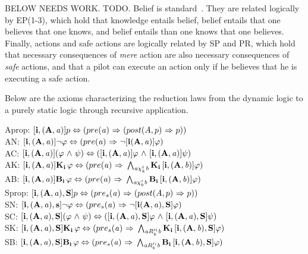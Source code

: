 BELOW NEEDS WORK.
TODO. Belief is standard~\cite{FHMV}. They are related logically by EP(1-3), which hold that knowledge entails belief, belief entails that one believes that one knows, and belief entails than one knows that one believes. Finally, actions and safe actions are logically related by SP and PR, which hold that necessary consequences of \emph{mere} action are also necessary consequences of \emph{safe} actions, and that a pilot can execute an action only if he believes that he is executing a safe action. 

Below are the axioms characterizing the reduction laws from the dynamic logic to a purely static logic through recursive application.\\
\begin{tcolorbox}
	Aprop: $\mathbf{[i,(A,\mathit{a})]}p \Leftrightarrow (pre(\mathit{a}){\ \Rightarrow \ }(post(A,p) {\ \Rightarrow \ } p))$\\
	AN: $\mathbf{[i,(A,\mathit{a})]}{\neg}\varphi \Leftrightarrow (pre(\mathit{a}) {\ \Rightarrow \ } {\neg} \mathbf{[i(A,\mathit{a})]}\varphi)$\\
	AC: $\mathbf{[i,(A,\mathit{a})]}(\varphi {\ \wedge \ } \psi) \Leftrightarrow (\mathbf{[i,(A,\mathit{a})]}\varphi {\ \wedge \ } \mathbf{[i,(A,\mathit{a})]}\psi)$\\
	AK: $\mathbf{[i,(A,\mathit{a})]}\mathbf{K}_{\mathbf{i}}\,\varphi \Leftrightarrow (pre(\mathit{a}) {\ \Rightarrow \ } \bigwedge_{\mathit{a}\chi_{k}^i \mathit{b}}\mathbf{K}_{\mathbf{i}}\,\mathbf{[i,(A,\mathit{b})]}\varphi)$\\
	AB: $\mathbf{[i,(A,\mathit{a})]}\mathbf{B}_{\mathbf{i}}\,\varphi \Leftrightarrow (pre(\mathit{a}) {\ \Rightarrow \ } \bigwedge_{\mathit{a}\chi_{b}^i \mathit{b}}\mathbf{B}_{\mathbf{i}}\,\mathbf{[i,(A,\mathit{b})]}\varphi)$\\
	Sprop: $\mathbf{[i,(A,\mathit{a}),S]}p \Leftrightarrow (pre_s(\mathit{a}) {\ \Rightarrow \ } (post(A,p) {\ \Rightarrow \ } p))$\\
	SN: $\mathbf{[i,(A,\mathit{a}),s]}{\neg}\varphi \Leftrightarrow (pre_s(\mathit{a}) {\ \Rightarrow \ } {\neg} \mathbf{[i(A,\mathit{a}),S]}\varphi)$\\
	SC: $\mathbf{[i,(A,\mathit{a}),S]}(\varphi {\ \wedge \ } \psi) \Leftrightarrow (\mathbf{[i,(A,\mathit{a}),S]}\varphi {\ \wedge \ } \mathbf{[i,(A,\mathit{a}),S]}\psi)$\\
	SK: $\mathbf{[i,(A,\mathit{a}),S]}\mathbf{K}_{\mathbf{i}}\,\varphi \Leftrightarrow (pre_s(\mathit{a}) {\ \Rightarrow \ } \bigwedge_{\mathit{a}R_{k}'^{i}\mathit{b}}\mathbf{K}_{\mathbf{i}}\,\mathbf{[i,(A,\mathit{b}),S]}\varphi)$\\
	SB: $\mathbf{[i,(A,\mathit{a}),S]}\mathbf{B}_{\mathbf{i}}\,\varphi \Leftrightarrow (pre_s(\mathit{a}) {\ \Rightarrow \ } \bigwedge_{\mathit{a}R_{b}'^{i}\mathit{b}}\mathbf{B}_{\mathbf{i}}\,\mathbf{[i,(A,\mathit{b}),S]}\varphi)$\\
\end{tcolorbox}




